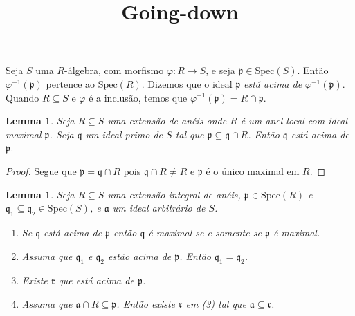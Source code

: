 \documentclass[12pt]{amsart}
\renewcommand{\a}{\mathfrak a}
\newcommand{\p}{\mathfrak p}
\newcommand{\q}{\mathfrak q}
\renewcommand{\r}{\mathfrak r}
\newcommand{\spec}[1]{\mbox{Spec}(#1)}
\newtheorem{lemma}[theorem]{Lemma}
\begin{document}
\Large
\title{Going-down}
\maketitle

Seja $S$ uma $R$-álgebra, com morfismo $\varphi:R\to S$, e seja $\p\in\spec S$. Então $\varphi^{-1}(\p)$ 
pertence ao $\spec R$.
Dizemos que o ideal $\p$ {\em está acima de} $\varphi^{-1}(\p)$. Quando $R\subseteq S$ e 
$\varphi$ é a inclusão, temos que $\varphi^{-1}(\p)=R\cap \p$. 


\begin{lemma}
    Seja $R\subseteq S$ uma extensão de anéis onde $R$ é um anel local com ideal maximal $\p$. 
    Seja $\q$ um ideal primo de $S$ tal que $\p\subseteq \q\cap R$. Então $\q$ está acima de $\p$. 
\end{lemma}
\begin{proof}
    Segue que $\p= \q\cap R$ pois $\q\cap R\neq R$ e $\p$ é o único maximal em $R$.
\end{proof}
\begin{lemma}
    Seja $R\subseteq S$ uma extensão integral de anéis, $\p\in\spec R$ e $\q_1\subseteq \q_2\in\spec S$, e
    $\a$ um ideal arbitrário de $S$. 
    \begin{enumerate}
        \item Se $\q$ está acima de $\p$ então $\q$ é maximal se e somente se $\p$ é maximal.
        \item Assuma que $\q_1$ e $\q_2$ estão acima de $\p$. Então $\q_1=\q_2$.
        \item Existe $\r$ que está acima de $\p$. 
        \item Assuma que $\a\cap R\subseteq \p$. Então existe $\r$ em (3) tal que $\a\subseteq \r$. 
    \end{enumerate}
\end{lemma}
\end{document}
